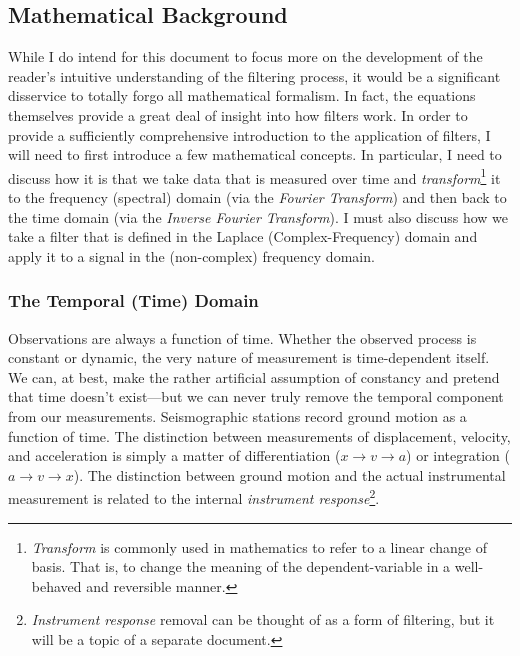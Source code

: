 \documentclass[american, twoside]{article}
\begin{document}
\subsection{Mathematical Background} \label{Background:Math}
While I do intend for this document to focus more on the development of the reader's intuitive understanding of the filtering process, it would be a significant
disservice to totally forgo all mathematical formalism. In fact, the equations themselves provide a great deal of insight into how filters work.
In order to provide a sufficiently comprehensive introduction to the application of filters, I will need to first introduce a few mathematical concepts. In particular,
I need to discuss how it is that we take data that is measured over time and \textit{transform}\footnote{\textit{Transform} is commonly used in mathematics to refer to
a linear change of basis. That is, to change the meaning of the dependent-variable in a well-behaved and reversible manner.} it to the \gls{frequency} (spectral) domain (via the \textit{Fourier Transform})
and then back to the time domain (via the \textit{Inverse Fourier Transform}). I must also discuss how we take a filter that is defined in the Laplace (Complex-Frequency)
domain and apply it to a signal in the (non-complex) \gls{frequency} domain.

\subsubsection{The Temporal (Time) Domain} \label{Background:Math:Temporal}
Observations are always a function of time. Whether the observed process is constant or dynamic, the very nature of measurement is time-dependent itself. We can, at best, make the
rather artificial assumption of constancy and pretend that time doesn't exist---but we can never truly remove the temporal component from our measurements. Seismographic stations
record ground motion as a function of time. The distinction between measurements of displacement, velocity, and acceleration is simply a matter of differentiation ($x\rightarrow v\rightarrow a$)
or integration ($a\rightarrow v \rightarrow x$). The distinction between ground motion and the actual instrumental measurement is related to the internal \textit{instrument response}\footnote{\textit{Instrument response}
removal can be thought of as a form of filtering, but it will be a topic of a separate document.}.
\end{document}
